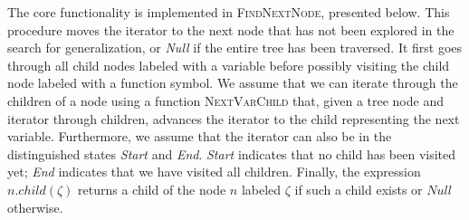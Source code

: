   The core functionality is implemented in \textsc{FindNext\-Node}, presented below. This
  procedure moves the iterator to the next node that has not been explored in the
  search for generalization, or \textit{Null} if the entire tree has been
  traversed. It first goes through all child nodes labeled with a variable before
  possibly visiting the child node labeled with a function symbol. We assume that
  we can iterate through the children of a node using a function
  \textsc{NextVarChild} that, given a tree node and iterator through children,
  advances the iterator to the child representing the next variable. Furthermore, we
  assume that the iterator can also be in the distinguished states \textit{Start}
  and \textit{End}.
  \textit{Start} indicates that no child has been visited yet; \textit{End}
  indicates that we have visited all children. Finally, the expression
  $n.\mathit{child}(\zeta)$ returns a child of the node $n$ labeled $\zeta$ if
  such a child exists or $\mathit{Null}$ otherwise.
  
